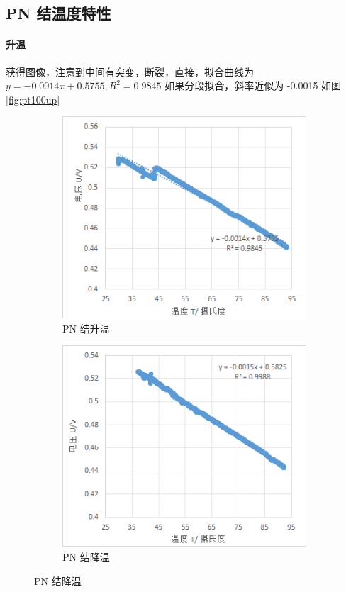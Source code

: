 \documentclass[a4paper]{../phyreport}
\begin{document}
\subsection{PN 结温度特性}
\paragraph{升温}获得图像，注意到中间有突变，断裂，直接，拟合曲线为 $y=-0.0014x+0.5755,R^2=0.9845$ 如果分段拟合，斜率近似为 -0.0015 如图 \ref{fig:pt100up}
\begin{figure}[H]
\centering
\begin{subfigure}{.5\textwidth}
\includegraphics[width=.8\linewidth]{测量水比热/20240508104639.png}
\caption[]{\label{fig:pnup} PN 结升温}
\end{subfigure}\hfil
\begin{subfigure}{.5\textwidth}
\includegraphics[width=.8\linewidth]{测量水比热/20240508105657.png}
\caption[]{\label{fig:pndn} PN 结降温}
\end{subfigure}
\end{figure}
\end{document}
